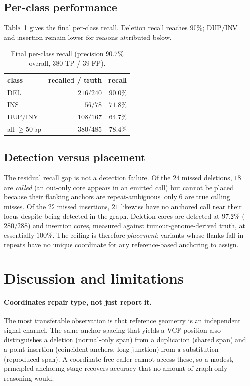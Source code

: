 \documentclass[11pt]{article}
\begin{document}
\subsection{Per-class performance}
Table~\ref{tab:perclass} gives the final per-class recall. Deletion recall reaches $90\%$;
DUP$/$INV and insertion remain lower for reasons attributed below.

\begin{table}[t]
\centering
\begin{tabular}{lrr}
\toprule
class & recalled / truth & recall \\
\midrule
DEL          & $216/240$ & $90.0\%$ \\
INS          & $56/78$   & $71.8\%$ \\
DUP$/$INV    & $108/167$ & $64.7\%$ \\
\midrule
all $\geq 50$\,bp & $380/485$ & $78.4\%$ \\
\bottomrule
\end{tabular}
\caption{Final per-class recall (precision $90.7\%$ overall, $380$ TP / $39$ FP).}
\label{tab:perclass}
\end{table}

\subsection{Detection versus placement}
The residual recall gap is not a detection failure. Of the $24$ missed deletions, $18$ are
\emph{called} (an out-only core appears in an emitted call) but cannot be placed because their
flanking anchors are repeat-ambiguous; only $6$ are true calling misses. Of the $22$ missed
insertions, $21$ likewise have no anchored call near their locus despite being detected in the
graph. Deletion cores are detected at $97.2\%$ ($280/288$) and insertion cores, measured against
tumour-genome-derived truth, at essentially $100\%$. The ceiling is therefore \emph{placement}:
variants whose flanks fall in repeats have no unique coordinate for any reference-based anchoring
to assign.

\section{Discussion and limitations}

\paragraph{Coordinates repair type, not just report it.}
The most transferable observation is that reference geometry is an independent signal channel. The
same anchor spacing that yields a VCF position also distinguishes a deletion (normal-only span)
from a duplication (shared span) and a point insertion (coincident anchors, long junction) from a
substitution (reproduced span). A coordinate-free caller cannot access these, so a modest,
principled anchoring stage recovers accuracy that no amount of graph-only reasoning would.
\end{document}

